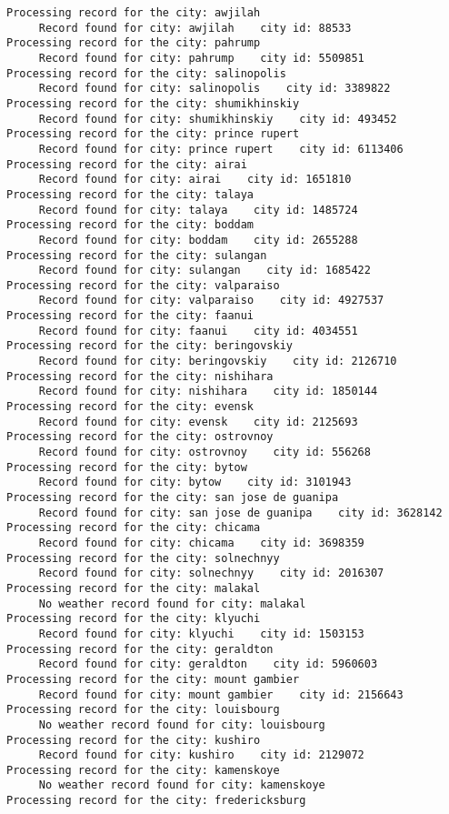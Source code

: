 \documentclass[11pt]{article}
\begin{document}
\begin{Verbatim}[commandchars=\\\{\}]
Processing record for the city: awjilah
     Record found for city: awjilah    city id: 88533
Processing record for the city: pahrump
     Record found for city: pahrump    city id: 5509851
Processing record for the city: salinopolis
     Record found for city: salinopolis    city id: 3389822
Processing record for the city: shumikhinskiy
     Record found for city: shumikhinskiy    city id: 493452
Processing record for the city: prince rupert
     Record found for city: prince rupert    city id: 6113406
Processing record for the city: airai
     Record found for city: airai    city id: 1651810
Processing record for the city: talaya
     Record found for city: talaya    city id: 1485724
Processing record for the city: boddam
     Record found for city: boddam    city id: 2655288
Processing record for the city: sulangan
     Record found for city: sulangan    city id: 1685422
Processing record for the city: valparaiso
     Record found for city: valparaiso    city id: 4927537
Processing record for the city: faanui
     Record found for city: faanui    city id: 4034551
Processing record for the city: beringovskiy
     Record found for city: beringovskiy    city id: 2126710
Processing record for the city: nishihara
     Record found for city: nishihara    city id: 1850144
Processing record for the city: evensk
     Record found for city: evensk    city id: 2125693
Processing record for the city: ostrovnoy
     Record found for city: ostrovnoy    city id: 556268
Processing record for the city: bytow
     Record found for city: bytow    city id: 3101943
Processing record for the city: san jose de guanipa
     Record found for city: san jose de guanipa    city id: 3628142
Processing record for the city: chicama
     Record found for city: chicama    city id: 3698359
Processing record for the city: solnechnyy
     Record found for city: solnechnyy    city id: 2016307
Processing record for the city: malakal
     No weather record found for city: malakal
Processing record for the city: klyuchi
     Record found for city: klyuchi    city id: 1503153
Processing record for the city: geraldton
     Record found for city: geraldton    city id: 5960603
Processing record for the city: mount gambier
     Record found for city: mount gambier    city id: 2156643
Processing record for the city: louisbourg
     No weather record found for city: louisbourg
Processing record for the city: kushiro
     Record found for city: kushiro    city id: 2129072
Processing record for the city: kamenskoye
     No weather record found for city: kamenskoye
Processing record for the city: fredericksburg

\end{Verbatim}
\end{document}
